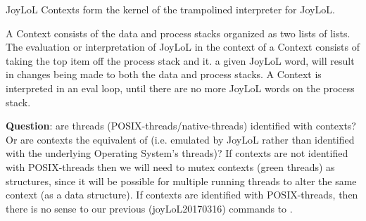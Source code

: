 
\startsection[title=Goals]

JoyLoL Contexts form the kernel of the trampolined interpreter for JoyLoL. 

A Context consists of the data and process stacks organized as two lists 
of lists. The evaluation or interpretation of JoyLoL in the context of a 
Context consists of taking the top item off the process stack and 
 it.  a given JoyLoL word, will result 
in changes being made to both the data and process stacks. A Context is 
interpreted in an eval loop, until there are no more JoyLoL words on the 
process stack. 

{\bf Question}: are threads (POSIX-threads/native-threads) identified with 
contexts? Or are contexts the equivalent of  (i.e. 
 emulated by JoyLoL rather than identified with the 
underlying Operating System's threads)? If contexts are not identified 
with POSIX-threads then we will need to mutex contexts (green threads) as 
 structures, since it will be possible for multiple running 
threads to alter the same context (as a data structure). If contexts are 
identified with POSIX-threads, then there is no sense to our previous 
(joyLoL20170316) commands to . 
